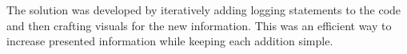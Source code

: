 The solution was developed by iteratively adding logging statements to the code and then crafting visuals for the new information.
This was an efficient way to increase presented information while keeping each addition simple.
